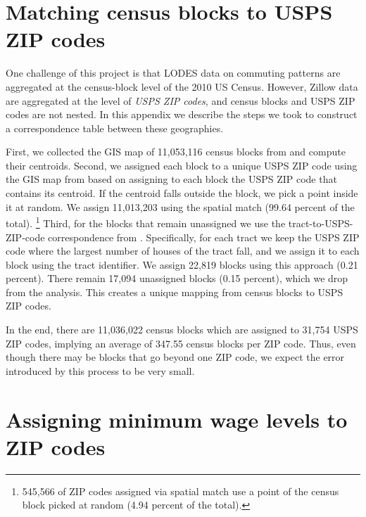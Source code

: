 \clearpage
\section{Matching census blocks to USPS ZIP codes}
\label{sec:blocks_to_uspszip}

One challenge of this project is that LODES data on commuting patterns are 
aggregated at the census-block level of the 2010 US Census.
However, Zillow data are aggregated at the level of \textit{USPS ZIP codes},
and census blocks and USPS ZIP codes are not nested.
In this appendix we describe the steps we took to construct a correspondence
table between these geographies.

First, we collected the GIS map of 11,053,116 census blocks from \textcite{cbTiger}
and compute their centroids.
Second, we assigned each block to a unique USPS ZIP code using the GIS map 
from \textcite{ESRI} based on assigning to each block the USPS ZIP code 
that contains its centroid.
If the centroid falls outside the block, we pick a point inside it at random.
We assign 11,013,203 using the spatial match (99.64 percent of the total).%
\footnote{545,566 of ZIP codes assigned via spatial match use 
a point of the census block picked at random (4.94 percent of the total).}
Third, for the blocks that remain unassigned we use the 
tract-to-USPS-ZIP-code correspondence from \textcite{hudCrosswalks}.
Specifically, for each tract we keep the USPS ZIP code where the largest number 
of houses of the tract fall, and we assign it to each block using the tract 
identifier.
We assign 22,819 blocks using this approach (0.21 percent).
There remain 17,094 unassigned blocks (0.15 percent), which we drop from the 
analysis.
This creates a unique mapping from census blocks to USPS ZIP codes.

In the end, there are 11,036,022 census blocks which are assigned to 31,754 
USPS ZIP codes, implying an average of 347.55 census blocks per ZIP code.
Thus, even though there may be blocks that go beyond one ZIP code, 
we expect the error introduced by this process to be very small.


\clearpage
\section{Assigning minimum wage levels to ZIP codes}
\label{sec:assigning_mw_levels}


